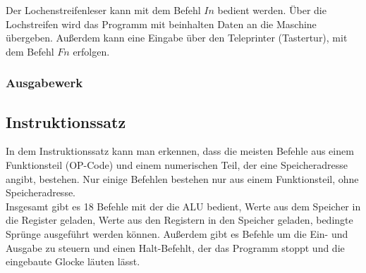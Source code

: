 \documentclass[12pt]{report}
\begin{document}
Der Lochenstreifenleser kann mit dem Befehl $I n$ bedient werden. Über die Lochstreifen wird das Programm mit beinhalten Daten an die Maschine übergeben. Außerdem kann eine Eingabe über den Teleprinter (Tastertur), mit dem Befehl $F n$ erfolgen.\\

\subsubsection{Ausgabewerk}



\subsection{Instruktionssatz}
In dem Instruktionssatz kann man erkennen, dass die meisten Befehle aus einem Funktionsteil (OP-Code) und einem numerischen Teil, der eine Speicheradresse angibt, bestehen. Nur einige Befehlen bestehen nur aus einem Funktionsteil, ohne Speicheradresse.\\
Insgesamt gibt es 18 Befehle mit der die ALU bedient, Werte aus dem Speicher in die Register geladen, Werte aus den Registern in den Speicher geladen, bedingte Sprünge ausgeführt werden können. Außerdem gibt es Befehle um die Ein- und Ausgabe zu steuern und einen Halt-Befehlt, der das Programm stoppt und die eingebaute Glocke läuten lässt.\\
\end{document}
